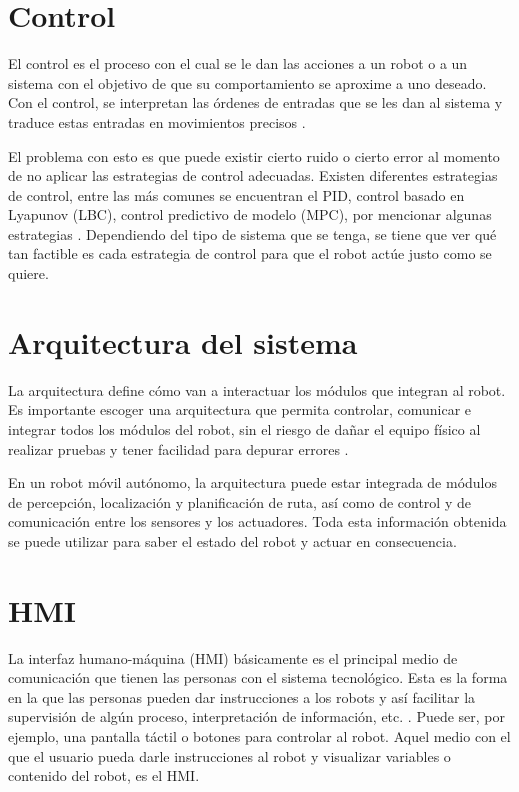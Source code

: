 \section{Control}
\label{sec:control}

El control es el proceso con el cual se le dan las acciones a un robot o a un sistema con el objetivo de que su comportamiento se aproxime a uno deseado. Con el control, se interpretan las órdenes de entradas que se les dan al sistema y traduce estas entradas en movimientos precisos \cite{MT9}.

El problema con esto es que puede existir cierto ruido o cierto error al momento de no aplicar las estrategias de control adecuadas. Existen diferentes estrategias de control, entre las más comunes se encuentran el PID, control basado en Lyapunov (LBC), control predictivo de modelo (MPC), por mencionar algunas estrategias \cite{MT10}. Dependiendo del tipo de sistema que se tenga, se tiene que ver qué tan factible es cada estrategia de control para que el robot actúe justo como se quiere.

\section{Arquitectura del sistema}
\label{sec:arq-del-sistema}

La arquitectura define cómo van a interactuar los módulos que integran al robot. Es importante escoger una arquitectura que permita controlar, comunicar e integrar todos los módulos del robot, sin el riesgo de dañar el equipo físico al realizar pruebas y tener facilidad para depurar errores \cite{MT11}.

En un robot móvil autónomo, la arquitectura puede estar integrada de módulos de percepción, localización y planificación de ruta, así como de control y de comunicación entre los sensores y los actuadores. Toda esta información obtenida se puede utilizar para saber el estado del robot y actuar en consecuencia.

\section{HMI}
\label{sec:HMI}

La interfaz humano-máquina (HMI) básicamente es el principal medio de comunicación que tienen las personas con el sistema tecnológico. Esta es la forma en la que las personas pueden dar instrucciones a los robots y así facilitar la supervisión de algún proceso, interpretación de información, etc. \cite{MT12}. Puede ser, por ejemplo, una pantalla táctil o botones para controlar al robot. Aquel medio con el que el usuario pueda darle instrucciones al robot y visualizar variables o contenido del robot, es el HMI.
